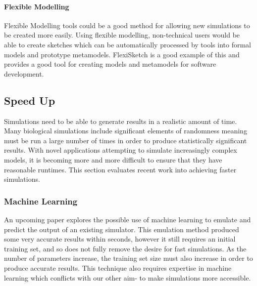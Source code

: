 \documentclass{UoYCSproject}
\begin{document}
\paragraph{Flexible Modelling}
Flexible Modelling tools could be a good method for allowing new simulations to be created more easily.
Using flexible modelling, non-technical users would be able to create sketches which can be automatically processed by tools into formal models and prototype metamodels\cite{Paige2017}.
FlexiSketch is a good example of this and provides a good tool for creating models and metamodels for software development\cite{flexisketch}.

\subsection{Speed Up}
Simulations need to be able to generate results in a realistic amount of time.
Many biological simulations include significant elements of randomness meaning must be run a large number of times in order to produce statistically significant results\cite{spartan}.
With novel applications attempting to simulate increasingly complex models, it is becoming more and more difficult to ensure that they have reasonable runtimes.
This section evaluates recent work into achieving faster simulations.

\subsubsection{Machine Learning}
An upcoming paper explores the possible use of machine learning to emulate and predict the output of an existing simulator\cite{kieran_machine_learning}.
This emulation method produced some very accurate results within seconds, however it still requires an initial training set, and so does not fully remove the desire for fast simulations.
As the number of parameters increase, the training set size must also increase in order to produce accurate results.
This technique also requires expertise in machine learning which conflicts with our other aim- to make simulations more accessible.
\end{document}
